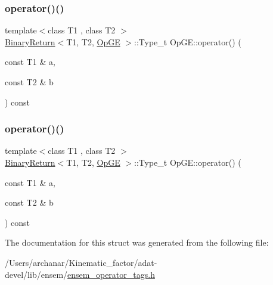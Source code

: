 \mbox{\label{structOpGE_a464b5c9cd38cdcfa8a0d8349c76e99a7}} 
\subsubsection{\texorpdfstring{operator()()}{operator()()}\hspace{0.1cm}{\footnotesize\ttfamily [2/3]}}
{\footnotesize\ttfamily template$<$class T1 , class T2 $>$ \\
\mbox{\hyperlink{structBinaryReturn}{Binary\+Return}}$<$T1, T2, \mbox{\hyperlink{structOpGE}{Op\+GE}} $>$\+::Type\+\_\+t Op\+G\+E\+::operator() (\begin{DoxyParamCaption}\item[{const T1 \&}]{a,  }\item[{const T2 \&}]{b }\end{DoxyParamCaption}) const\hspace{0.3cm}{\ttfamily [inline]}}

\mbox{\label{structOpGE_a464b5c9cd38cdcfa8a0d8349c76e99a7}} 
\subsubsection{\texorpdfstring{operator()()}{operator()()}\hspace{0.1cm}{\footnotesize\ttfamily [3/3]}}
{\footnotesize\ttfamily template$<$class T1 , class T2 $>$ \\
\mbox{\hyperlink{structBinaryReturn}{Binary\+Return}}$<$T1, T2, \mbox{\hyperlink{structOpGE}{Op\+GE}} $>$\+::Type\+\_\+t Op\+G\+E\+::operator() (\begin{DoxyParamCaption}\item[{const T1 \&}]{a,  }\item[{const T2 \&}]{b }\end{DoxyParamCaption}) const\hspace{0.3cm}{\ttfamily [inline]}}



The documentation for this struct was generated from the following file\+:\begin{DoxyCompactItemize}
\item 
/\+Users/archanar/\+Kinematic\+\_\+factor/adat-\/devel/lib/ensem/\mbox{\hyperlink{adat-devel_2lib_2ensem_2ensem__operator__tags_8h}{ensem\+\_\+operator\+\_\+tags.\+h}}\end{DoxyCompactItemize}
